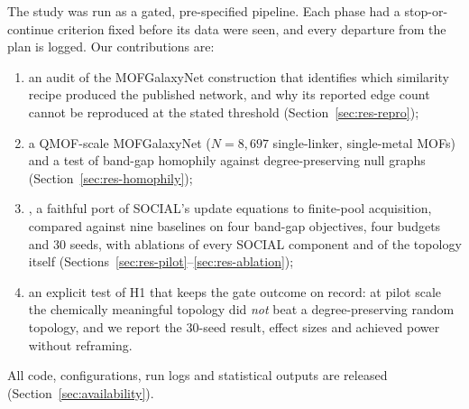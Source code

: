 The study was run as a gated, pre-specified pipeline. Each phase had a stop-or-continue criterion fixed before its data were seen, and every departure from the plan is logged. Our contributions are:
\begin{enumerate}
  \item an audit of the MOFGalaxyNet construction that identifies which similarity recipe produced the published network, and why its reported edge count cannot be reproduced at the stated threshold (Section~\ref{sec:res-repro});
  \item a QMOF-scale MOFGalaxyNet ($N=8{,}697$ single-linker, single-metal MOFs) and a test of band-gap homophily against degree-preserving null graphs (Section~\ref{sec:res-homophily});
  \item \gs{}, a faithful port of SOCIAL's update equations to finite-pool acquisition, compared against nine baselines on four band-gap objectives, four budgets and 30 seeds, with ablations of every SOCIAL component and of the topology itself (Sections~\ref{sec:res-pilot}--\ref{sec:res-ablation});
  \item an explicit test of H1 that keeps the gate outcome on record: at pilot scale the chemically meaningful topology did \emph{not} beat a degree-preserving random topology, and we report the 30-seed result, effect sizes and achieved power without reframing.
\end{enumerate}
All code, configurations, run logs and statistical outputs are released (Section~\ref{sec:availability}).
